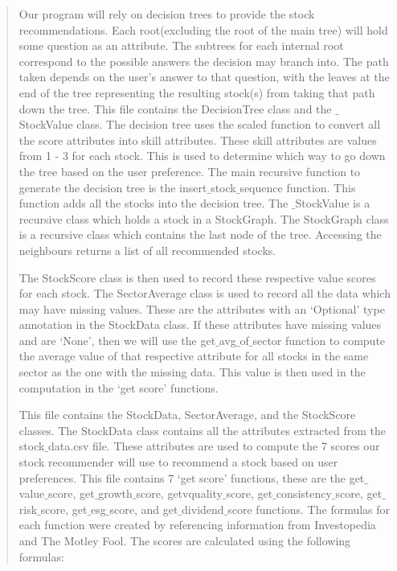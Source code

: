 \documentclass[fontsize=12pt]{article}
\begin{document}
\begin{quote}
\noindent Our program will rely on decision trees to provide the stock recommendations. Each root(excluding the root of the main tree) will hold some question as an attribute. The subtrees for each internal root correspond to the possible answers the decision may branch into. The path taken depends on the user’s answer to that question, with the leaves at the end of the tree representing the resulting stock(s) from taking that path down the tree. This file contains the DecisionTree class and the $\_$StockValue class. The decision tree uses the scaled function to convert all the score attributes into skill attributes. These skill attributes are values from 1 - 3 for each stock. This is used to determine which way to go down the tree based on the user preference. The main recursive function to generate the decision tree is the insert$\_$stock$\_$sequence function. This function adds all the stocks into the decision tree. The $\_$StockValue is a recursive class which holds a stock in a StockGraph. The StockGraph class is a recursive class which contains the last node of the tree. Accessing the neighbours returns a list of all recommended stocks.

The StockScore class is then used to record these respective value scores for each stock. The SectorAverage class is used to record all the data which may have missing values. These are the attributes with an ‘Optional’ type annotation in the StockData class. If these attributes have missing values and are ‘None’, then we will use the get$\_$avg$\_$of$\_$sector function to compute the average value of that respective attribute for all stocks in the same sector as the one with the missing data. This value is then used in the computation in the ‘get score’ functions. 

This file contains the StockData, SectorAverage, and the StockScore classes. The StockData class contains all the attributes extracted from the stock$\_$data.csv file. These attributes are used to compute the 7 scores our stock recommender will use to recommend a stock based on user preferences. This file contains 7 ‘get score’ functions, these are the get$\_$value$\_$score, get$\_$growth$\_$score, getvquality$\_$score, get$\_$consistency$\_$score, get$\_$risk$\_$score, get$\_$esg$\_$score, and get$\_$dividend$\_$score functions. The formulas for each function were created by referencing information from Investopedia and The Motley Fool. The scores are calculated using the following formulas:


\end{quote}
\end{document}
